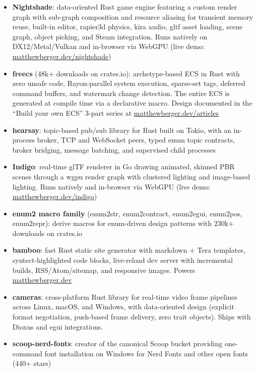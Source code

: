 \documentclass[11pt,letterpaper]{article}
\begin{document}
\begin{itemize}
  \item \textbf{Nightshade}: data-oriented Rust game engine featuring a custom render graph with sub-graph composition and resource aliasing for transient memory reuse, built-in editor, rapier3d physics, kira audio, gltf asset loading, scene graph, object picking, and Steam integration. Runs natively on DX12/Metal/Vulkan and in-browser via WebGPU (live demo: \href{https://matthewberger.dev/nightshade}{matthewberger.dev/nightshade})
  \item \textbf{freecs} (48k+ downloads on crates.io): archetype-based ECS in Rust with zero unsafe code, Rayon-parallel system execution, sparse-set tags, deferred command buffers, and watermark change detection. The entire ECS is generated at compile time via a declarative macro. Design documented in the ``Build your own ECS'' 3-part series at \href{https://matthewberger.dev/articles}{matthewberger.dev/articles}
  \item \textbf{hearsay}: topic-based pub/sub library for Rust built on Tokio, with an in-process broker, TCP and WebSocket peers, typed enum topic contracts, broker bridging, message batching, and supervised child processes
  \item \textbf{Indigo}: real-time glTF renderer in Go drawing animated, skinned PBR scenes through a wgpu render graph with clustered lighting and image-based lighting. Runs natively and in-browser via WebGPU (live demo: \href{https://matthewberger.dev/indigo}{matthewberger.dev/indigo})
  \item \textbf{enum2 macro family} (enum2str, enum2contract, enum2egui, enum2pos, enum2repr): derive macros for enum-driven design patterns with 230k+ downloads on crates.io
  \item \textbf{bamboo}: fast Rust static site generator with markdown + Tera templates, syntect-highlighted code blocks, live-reload dev server with incremental builds, RSS/Atom/sitemap, and responsive images. Powers \href{https://matthewberger.dev}{matthewberger.dev}
  \item \textbf{cameras}: cross-platform Rust library for real-time video frame pipelines across Linux, macOS, and Windows, with data-oriented design (explicit format negotiation, push-based frame delivery, zero trait objects). Ships with Dioxus and egui integrations.
  \item \textbf{scoop-nerd-fonts}: creator of the canonical Scoop bucket providing one-command font installation on Windows for Nerd Fonts and other open fonts (440+ stars)
\end{itemize}
\end{document}
